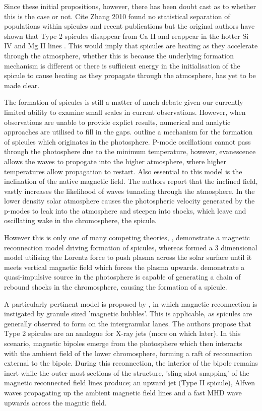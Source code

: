 Since these initial propositions, however, there has been doubt cast as to whether this is the case or not. 
Cite Zhang 2010 found no statistical separation of populations within spicules and recent publications but the original authors have shown that Type-2 spicules disappear from Ca II and reappear in the hotter Si IV and Mg II lines \citep{Pereira2014}.
This would imply that spicules are heating as they accelerate through the atmosphere, whether this is because the underlying formation mechanism is different or there is sufficient energy in the initialisation of the spicule to cause heating as they propagate through the atmosphere, has yet to be made clear.

The formation of spicules is still a matter of much debate given our currently limited ability to examine small scales in current observations. 
However, when observations are unable to provide explict results, numerical and analytic approaches are utilised to fill in the gaps.
\cite{DePointeu2004} outline a mechanism for the formation of spicules which originates in the photosphere.
P-mode oscillations cannot pass through the photosphere due to the minimum temperature, however, evanescence allows the waves to propogate into the higher atmosphere, where higher temperatures allow propagation to restart.
Also essential to this model is the inclination of the native magnetic field.
The authors report that the inclined field, vastly increases the likelihood of waves tunneling through the atmosphere. 
In the lower density solar atmosphere causes the photospheric velocity generated by the p-modes to leak into the atmosphere and steepen into shocks, which leave and oscillating wake in the chromosphere, the spicule.

However this is only one of many competing theories, \cite{Takeuchi2001}, demonstrate a magnetic reconnection model driving formation of spicules, whereas \cite{Martinez2011} formed a $3$ dimensional model utilising the Lorentz force to push plasma across the solar surface until it meets vertical magnetic field which forces the plasma upwards.
\cite{Hollweg1982} demonstrate a quasi-impulsive source in the photosphere is capable of generating a chain of rebound shocks in the chromosphere, causing the formation of a spicule.

A particularly pertinent model is proposed by \cite{Moore2011spic_recon}, in which magnetic reconnection is instigated by granule sized 'magnetic bubbles'.
This is applicable, as spicules are generally observed to form on the intergranular lanes.
The authors propose that Type 2 spicules are an analogue for X-ray jets (more on which later).
In this scenario, magnetic bipoles emerge from the photosphere which then interacts with the ambient field of the lower chromosphere, forming a raft of reconnection external to the bipole.
During this reconnection, the interior of the bipole remains inert while the outer most sections of the structure, 'sling shot snapping' of the magnetic reconnected field lines produce; an upward jet (Type II spicule), Alfven waves propagating up the ambient magnetic field lines and a fast MHD wave upwards across the magntic field.

